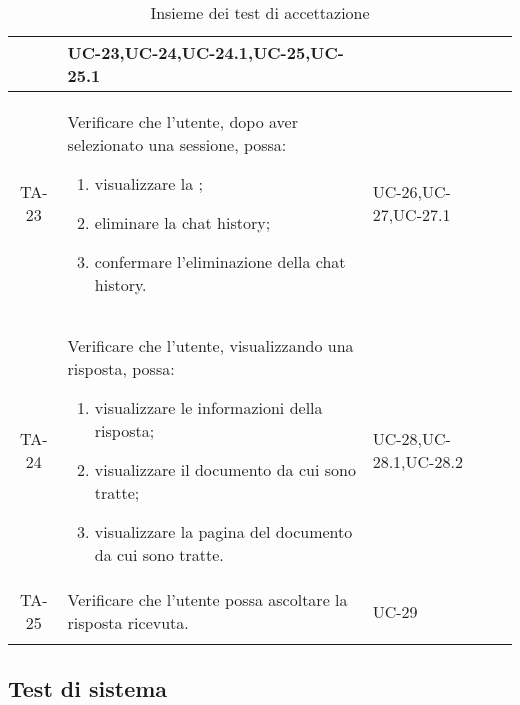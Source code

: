 \begin{xltabular}{\textwidth}{| c | X | X | c |}
\begin{enumerate}
    \end{enumerate}& UC-23,\newline UC-24,\newline UC-24.1,\newline UC-25,\newline UC-25.1 & \textcolor{cmarkcolor}{} \\
    \hline
    TA-23 & Verificare che l'utente, dopo aver selezionato una sessione, possa:
    \begin{enumerate}
        \item visualizzare la ;
        \item eliminare la chat history;
        \item confermare l'eliminazione della chat history.
    \end{enumerate}& UC-26,\newline UC-27,\newline UC-27.1 & \textcolor{cmarkcolor}{}  \\
    \hline
     TA-24 & Verificare che l'utente, visualizzando una risposta, possa:
    \begin{enumerate}
        \item visualizzare le informazioni della risposta;
        \item visualizzare il documento da cui sono tratte;
        \item visualizzare la pagina del documento da cui sono tratte.
    \end{enumerate}& UC-28,\newline UC-28.1,\newline UC-28.2 & \textcolor{cmarkcolor}{} \\
    \hline
    TA-25 & Verificare che l'utente possa ascoltare la risposta ricevuta.& UC-29 & \textcolor{xmarkcolor}{} \\
    \hline
     \caption{Insieme dei test di accettazione} 
\end{xltabular}
\endgroup

\newpage
\subsection{Test di sistema}

